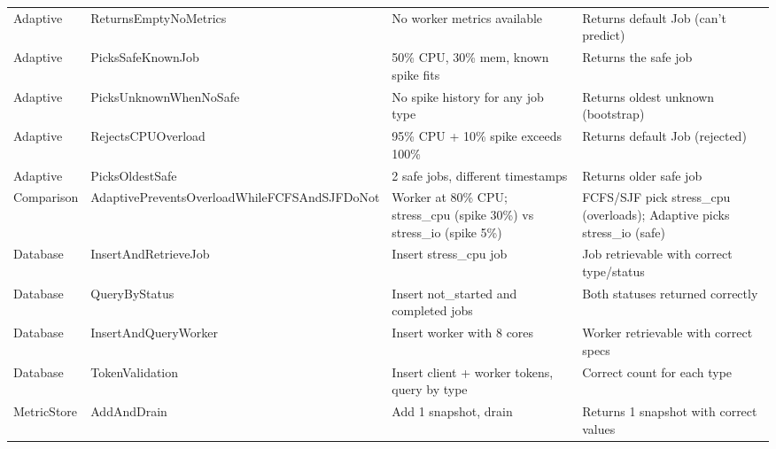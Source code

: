 \begin{table}[htbp]
{\begin{tabular}{llll}
			\midrule
			Adaptive       & ReturnsEmptyNoMetrics                        & No worker metrics available                                            & Returns default Job (can't predict)                                     \\
			Adaptive       & PicksSafeKnownJob                            & 50\% CPU, 30\% mem, known spike fits                                   & Returns the safe job                                                    \\
			Adaptive       & PicksUnknownWhenNoSafe                       & No spike history for any job type                                      & Returns oldest unknown (bootstrap)                                      \\
			Adaptive       & RejectsCPUOverload                           & 95\% CPU + 10\% spike exceeds 100\%                                    & Returns default Job (rejected)                                          \\
			Adaptive       & PicksOldestSafe                              & 2 safe jobs, different timestamps                                      & Returns older safe job                                                  \\
			\midrule
			Comparison     & AdaptivePreventsOverloadWhileFCFSAndSJFDoNot & Worker at 80\% CPU; stress\_cpu (spike 30\%) vs stress\_io (spike 5\%) & FCFS/SJF pick stress\_cpu (overloads); Adaptive picks stress\_io (safe) \\
			\midrule
			Database       & InsertAndRetrieveJob                         & Insert stress\_cpu job                                                 & Job retrievable with correct type/status                                \\
			Database       & QueryByStatus                                & Insert not\_started and completed jobs                                 & Both statuses returned correctly                                        \\
			Database       & InsertAndQueryWorker                         & Insert worker with 8 cores                                             & Worker retrievable with correct specs                                   \\
			Database       & TokenValidation                              & Insert client + worker tokens, query by type                           & Correct count for each type                                             \\
			\midrule
			MetricStore    & AddAndDrain                                  & Add 1 snapshot, drain                                                  & Returns 1 snapshot with correct values                                  \\

\end{tabular}}
\end{table}
